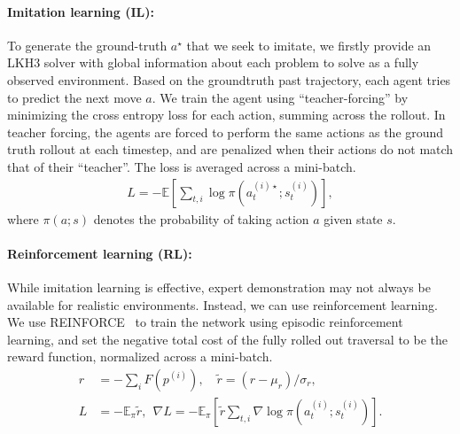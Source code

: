 \paragraph{Imitation learning (IL):}
To generate the ground-truth $a^\star$ that we seek to imitate, we firstly provide an LKH3 solver
with global information about each problem to solve as a  fully observed environment. Based on the
groundtruth past trajectory, each agent tries to predict the next move $a$.  We train the agent
using ``teacher-forcing'' by minimizing the cross entropy loss for each action, summing across the
rollout. In teacher forcing, the agents are forced to perform the same actions as the ground truth rollout at
each timestep, and are penalized when their actions do not match that of their ``teacher''. The loss is averaged across a mini-batch.
\begin{align}
L = - \mathbb{E}[\sum_{t,i} \log \pi(a_t^{(i)\star}; s_t^{(i)}) ],
\end{align}
where $\pi(a; s)$ denotes the probability of taking action $a$ given state $s$.

\paragraph{Reinforcement learning (RL):}
While imitation learning is effective, expert demonstration may not always be available for realistic environments.  Instead, we can use
reinforcement learning. We use REINFORCE~\cite{reinforce} to train
the network using episodic reinforcement learning, and set the negative total cost of the fully
rolled out traversal to be the reward function, normalized across a mini-batch.
\begin{align}
r &= - \sum_{i} F(p^{(i)}), \quad
\tilde{r} = (r - \mu_r) / \sigma_r, \\
L &= - \mathbb{E}_{\pi}\tilde{r}, \ \
\nabla L = -\mathbb{E}_{\pi}[
\tilde{r} \sum_{t, i} \nabla \log \pi (a_t^{(i)}; s_t^{(i)} )
].
\end{align}
